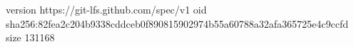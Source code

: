 version https://git-lfs.github.com/spec/v1
oid sha256:82fea2c204b9338cddceb0f890815902974b55a60788a32afa365725e4c9ccfd
size 131168
